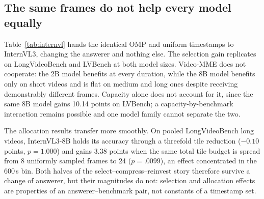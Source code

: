 \documentclass[11pt]{article}
\begin{document}
\subsection{The same frames do not help every model equally}
\label{sec:transfer}

Table~\ref{tab:internvl} hands the identical OMP and uniform timestamps to InternVL3, changing the answerer and nothing else.
The selection gain replicates on LongVideoBench and LVBench at both model sizes.
Video-MME does not cooperate: the 2B model benefits at every duration, while the 8B model benefits only on short videos and is flat on medium and long ones despite receiving demonstrably different frames.
Capacity alone does not account for it, since the same 8B model gains 10.14 points on LVBench; a capacity-by-benchmark interaction remains possible and one model family cannot separate the two.

\begin{table}[t]
\centering
\small
{}
\caption{OMP minus uniform accuracy on identical timestamps and tile budgets with InternVL3. Deltas are percentage points.}
\label{tab:internvl}
\end{table}

The allocation results transfer more smoothly.
On pooled LongVideoBench long videos, InternVL3-8B holds its accuracy through a threefold tile reduction ($-0.10$ points, $p{=}1.000$) and gains 3.38 points when the same total tile budget is spread from 8 uniformly sampled frames to 24 ($p{=}.0099$), an effect concentrated in the 600\,s bin.
Both halves of the select--compress--reinvest story therefore survive a change of answerer, but their magnitudes do not: selection and allocation effects are properties of an answerer--benchmark pair, not constants of a timestamp set.
\end{document}
